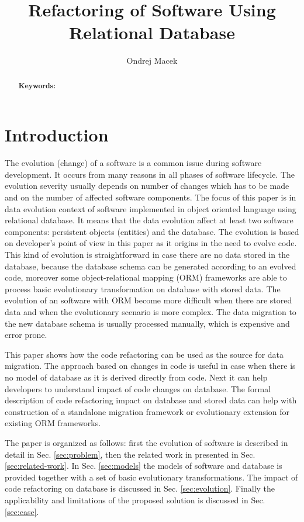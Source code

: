 \documentclass[runningheads]{comsis}
\title{Refactoring of Software Using Relational Database}
\author{Ondrej Macek\inst{1}}
\institute{Czech Technical University in Prague\\
  Karlovo namesti 13 \\
121 35 Praha 2, Czech Republic\\
  \email{ondrej.macek@fel.cvut.cz}}
\begin{document}
\maketitle

\begin{abstract}

\vspace{6pt}\textbf{Keywords:}
\end{abstract}


\section{Introduction}
\label{sec:intro}
The evolution (change) of a software is a common issue during software development. It occurs from many reasons in all phases of software lifecycle. The evolution severity usually depends on number of changes which has to be made and on the number of affected software components. The focus of this paper is in data evolution context of software implemented in object oriented language using relational database. It means that the data evolution affect at least two software components: persistent objects (entities) and the database. The evolution is based on developer's point of view in this paper as it origins in the need to evolve code. This kind of evolution is straightforward in case there are no data stored in the database, because the database schema can be generated according to an evolved code, moreover some object-relational mapping (ORM) frameworks are able to process basic evolutionary transformation on database with stored data. The evolution of an software with ORM become more difficult when there are stored data and when the evolutionary scenario is more complex. The data migration to the new database schema is usually processed manually, which is expensive and error prone.

This paper shows how the code refactoring can be used as the source for data migration. The approach based on changes in code is useful in case when there is no model of database as it is derived directly from code. Next it can help developers to understand impact  of code changes on database. The formal description of code refactoring impact on database and stored data can help with construction of a standalone migration framework or evolutionary extension for existing ORM frameworks.

The paper is organized as follows: first the evolution of software is described in detail in Sec. \ref{sec:problem}, then the related work in presented in Sec. \ref{sec:related-work}. In Sec. \ref{sec:models} the models of software and database is provided together with a set of basic evolutionary transformations. The impact of code refactoring on database is discussed in Sec. \ref{sec:evolution}. Finally the applicability and limitations of the proposed solution is discussed in Sec. \ref{sec:case}.
\end{document}
